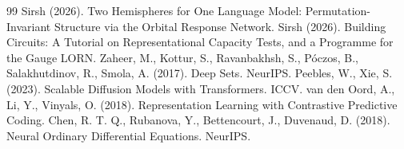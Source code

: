 \documentclass[10pt, twocolumn, a4paper]{article}
\begin{document}
\begin{thebibliography}{99}
 Sirsh (2026). Two Hemispheres for One Language Model: Permutation-Invariant Structure via the Orbital Response Network.
 Sirsh (2026). Building Circuits: A Tutorial on Representational Capacity Tests, and a Programme for the Gauge LORN.
 Zaheer, M., Kottur, S., Ravanbakhsh, S., P\'{o}czos, B., Salakhutdinov, R., Smola, A. (2017). Deep Sets. NeurIPS.
 Peebles, W., Xie, S. (2023). Scalable Diffusion Models with Transformers. ICCV.
 van den Oord, A., Li, Y., Vinyals, O. (2018). Representation Learning with Contrastive Predictive Coding.
 Chen, R. T. Q., Rubanova, Y., Bettencourt, J., Duvenaud, D. (2018). Neural Ordinary Differential Equations. NeurIPS.
\end{thebibliography}
\end{document}
